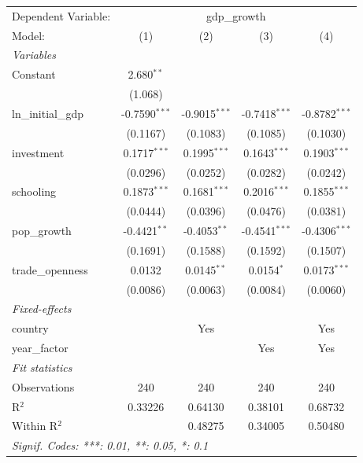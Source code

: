 
\begingroup
\centering
\begin{tabular}{lcccc}
   \tabularnewline \midrule \midrule
   Dependent Variable: & \multicolumn{4}{c}{gdp\_growth}\\
   Model:             & (1)             & (2)             & (3)             & (4)\\  
   \midrule
   \emph{Variables}\\
   Constant           & 2.680$^{**}$    &                 &                 &   \\   
                      & (1.068)         &                 &                 &   \\   
   ln\_initial\_gdp   & -0.7590$^{***}$ & -0.9015$^{***}$ & -0.7418$^{***}$ & -0.8782$^{***}$\\   
                      & (0.1167)        & (0.1083)        & (0.1085)        & (0.1030)\\   
   investment         & 0.1717$^{***}$  & 0.1995$^{***}$  & 0.1643$^{***}$  & 0.1903$^{***}$\\   
                      & (0.0296)        & (0.0252)        & (0.0282)        & (0.0242)\\   
   schooling          & 0.1873$^{***}$  & 0.1681$^{***}$  & 0.2016$^{***}$  & 0.1855$^{***}$\\   
                      & (0.0444)        & (0.0396)        & (0.0476)        & (0.0381)\\   
   pop\_growth        & -0.4421$^{**}$  & -0.4053$^{**}$  & -0.4541$^{***}$ & -0.4306$^{***}$\\   
                      & (0.1691)        & (0.1588)        & (0.1592)        & (0.1507)\\   
   trade\_openness    & 0.0132          & 0.0145$^{**}$   & 0.0154$^{*}$    & 0.0173$^{***}$\\   
                      & (0.0086)        & (0.0063)        & (0.0084)        & (0.0060)\\   
   \midrule
   \emph{Fixed-effects}\\
   country            &                 & Yes             &                 & Yes\\  
   year\_factor       &                 &                 & Yes             & Yes\\  
   \midrule
   \emph{Fit statistics}\\
   Observations       & 240             & 240             & 240             & 240\\  
   R$^2$              & 0.33226         & 0.64130         & 0.38101         & 0.68732\\  
   Within R$^2$       &                 & 0.48275         & 0.34005         & 0.50480\\  
   \midrule \midrule
   \multicolumn{5}{l}{\emph{Signif. Codes: ***: 0.01, **: 0.05, *: 0.1}}\\
\end{tabular}
\par\endgroup


